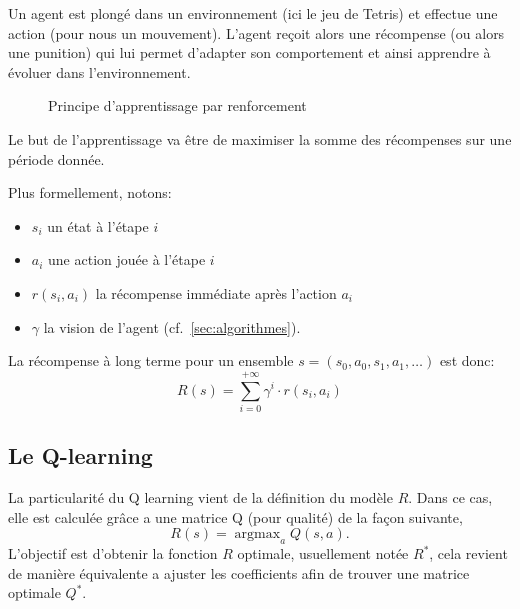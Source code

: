 \documentclass{report}
\DeclareMathOperator{\argmax}{argmax}
\begin{document}
Un agent est plongé dans un environnement (ici le jeu de Tetris) et effectue une
action (pour nous un mouvement). L'agent reçoit alors une récompense (ou alors
une punition) qui lui permet d'adapter son comportement et ainsi apprendre à
évoluer dans l'environnement.

\begin{figure}[h]
    \begin{center}
    \end{center}

    \caption{Principe d'apprentissage par renforcement}
    \label{}
\end{figure}

Le but de l'apprentissage va être de maximiser la somme des récompenses sur une
période donnée.

Plus formellement, notons:
\begin{itemize}
    \item \( s_i \) un état à l'étape \( i \)
    \item \( a_i \) une action jouée à l'étape \( i \)
    \item \( r(s_i, a_i) \) la récompense immédiate après l'action \( a_i \)
    \item \( \gamma \) la vision de l'agent (cf.~\ref{sec:algorithmes}).
\end{itemize}

La récompense à long terme pour un ensemble
\( s = (s_0, a_0, s_1, a_1, \hdots) \) est donc:
\[
  R(s) = \sum_{i=0}^{+\infty}\gamma^i \cdot r(s_i, a_i)
\]


\subsection{Le Q-learning}
La particularité du Q learning vient de la définition du modèle \(R\). Dans ce
cas, elle est calculée grâce a une matrice Q (pour qualité) de la façon
suivante,
\[
  R(s) = \argmax_{a} Q(s,a).
\]
L'objectif est d'obtenir la fonction \(R\) optimale, usuellement notée
\(R^*\), cela revient de manière équivalente a ajuster les coefficients afin de
trouver une matrice optimale \(Q^*\).
\end{document}
